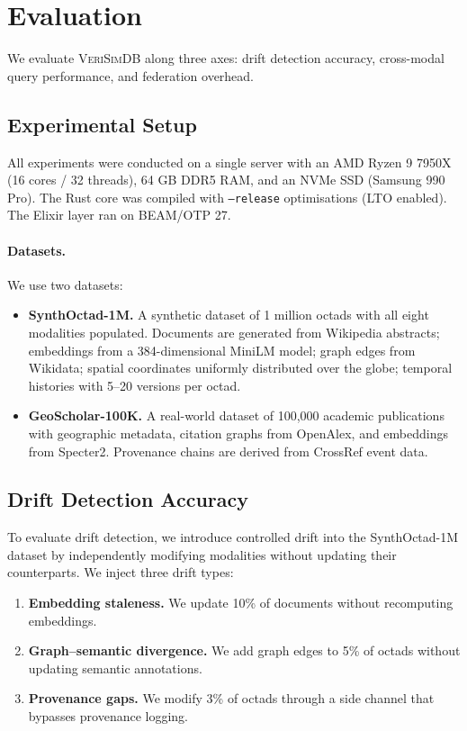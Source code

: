 \documentclass[11pt,twocolumn]{article}
\newcommand{\verisimdb}{\textsc{VeriSimDB}\xspace}
\begin{document}
\section{Evaluation}\label{sec:evaluation}

We evaluate \verisimdb along three axes: drift detection accuracy,
cross-modal query performance, and federation overhead.

\subsection{Experimental Setup}

All experiments were conducted on a single server with an AMD Ryzen 9 7950X
(16 cores / 32 threads), 64 GB DDR5 RAM, and an NVMe SSD (Samsung 990 Pro).
The Rust core was compiled with \texttt{--release} optimisations (LTO enabled).
The Elixir layer ran on BEAM/OTP 27.

\paragraph{Datasets.}
We use two datasets:
\begin{itemize}[leftmargin=*]
  \item \textbf{SynthOctad-1M.}  A synthetic dataset of 1 million octads
    with all eight modalities populated.  Documents are generated from
    Wikipedia abstracts; embeddings from a 384-dimensional MiniLM model;
    graph edges from Wikidata; spatial coordinates uniformly distributed
    over the globe; temporal histories with 5--20 versions per octad.
  \item \textbf{GeoScholar-100K.}  A real-world dataset of 100{,}000
    academic publications with geographic metadata, citation graphs from
    OpenAlex, and embeddings from Specter2.  Provenance chains are
    derived from CrossRef event data.
\end{itemize}

\subsection{Drift Detection Accuracy}

To evaluate drift detection, we introduce controlled drift into the
SynthOctad-1M dataset by independently modifying modalities without updating
their counterparts.  We inject three drift types:

\begin{enumerate}[leftmargin=*]
  \item \textbf{Embedding staleness.}  We update 10\% of documents without
    recomputing embeddings.
  \item \textbf{Graph--semantic divergence.}  We add graph edges to 5\% of
    octads without updating semantic annotations.
  \item \textbf{Provenance gaps.}  We modify 3\% of octads through a
    side channel that bypasses provenance logging.
\end{enumerate}
\end{document}
